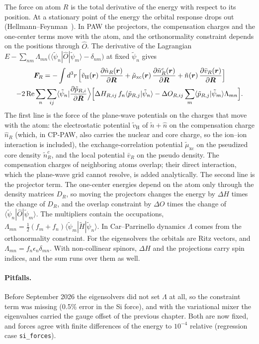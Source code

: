 \documentclass[11pt,a4paper,oneside]{book}
\newcommand{\bra}[1]{\langle #1|}
\newcommand{\ket}[1]{|#1\rangle}
\newcommand{\braket}[2]{\langle #1|#2\rangle}
\newcommand{\pt}{\tilde p}
\begin{document}
The force on atom $R$ is the total derivative of the energy with respect
to its position. At a stationary point of the energy the orbital
response drops out (Hellmann--Feynman~\cite{Feynman1939}). In PAW the
projectors, the compensation charges and the one-center terms move with
the atom, and the orthonormality constraint depends on the positions
through $\hat O$. The derivative of the Lagrangian
$E-\sum_{nm}\Lambda_{mn}\bigl(\bra{\tilde\psi_n}\hat O\ket{\tilde\psi_m}-\delta_{nm}\bigr)$
at fixed $\tilde\psi_n$ gives
\begin{multline}
  \bm F_R=
  -\int d^3r\,\Bigl[\tilde v_{\mathrm H}(\bm r)\,
  \frac{\partial\hat n_R(\bm r)}{\partial\bm R}
  +\tilde\mu_{\mathrm{xc}}(\bm r)\,\frac{\partial\tilde n^c_R(\bm r)}{\partial\bm R}
  +\tilde n(\bm r)\,\frac{\partial\bar v_R(\bm r)}{\partial\bm R}\Bigr]
  \\
  -2\,\mathrm{Re}\sum_{n}\sum_{ij}
  \bra{\tilde\psi_n}\frac{\partial\pt_{R,i}}{\partial\bm R}\Bigr\rangle
  \Bigl[\Delta H_{R,ij}\,f_n\braket{\pt_{R,j}}{\tilde\psi_n}
  -\Delta O_{R,ij}\sum_m\braket{\pt_{R,j}}{\tilde\psi_m}\Lambda_{mn}\Bigr].
  \label{eq:pawforce}
\end{multline}
The first line is the force of the plane-wave potentials on the charges
that move with the atom: the electrostatic potential $\tilde v_{\mathrm H}$
of $\tilde n+\hat n$ on the compensation charge $\hat n_R$ (which, in
CP-PAW, also carries the nuclear and core charge, so the ion--ion
interaction is included), the exchange-correlation potential
$\tilde\mu_{\mathrm{xc}}$ on the pseudized core density $\tilde n^c_R$, and
the local potential $\bar v_R$ on the pseudo density. The compensation
charges of neighboring atoms overlap; their direct interaction, which the
plane-wave grid cannot resolve, is added analytically. The second line is
the projector term. The one-center energies depend on the atom only
through the density matrices $D_R$, so moving the projectors changes the
energy by $\Delta H$ times the change of $D_R$, and the overlap constraint
by $\Delta O$ times the change of $\bra{\tilde\psi_n}\hat O\ket{\tilde\psi_m}$.
The multipliers contain the occupations,
$\Lambda_{mn}=\frac12(f_m+f_n)\bra{\tilde\psi_m}\tilde H\ket{\tilde\psi_n}$.
In Car--Parrinello dynamics $\Lambda$ comes from the orthonormality
constraint. For the eigensolvers the orbitals are Ritz vectors, and
$\Lambda_{mn}=f_n\epsilon_n\delta_{mn}$. With non-collinear spinors,
$\Delta H$ and the projections carry spin indices, and the sum runs over
them as well.

\paragraph{Pitfalls.} Before September 2026 the eigensolvers did not set
$\Lambda$ at all, so the constraint term was missing (0.5\% error in the
Si force), and with the variational mixer the eigenvalues carried the
gauge offset of the previous chapter. Both are now fixed, and forces
agree with finite differences of the energy to $10^{-4}$ relative
(regression case \texttt{si\_forces}).
\end{document}
